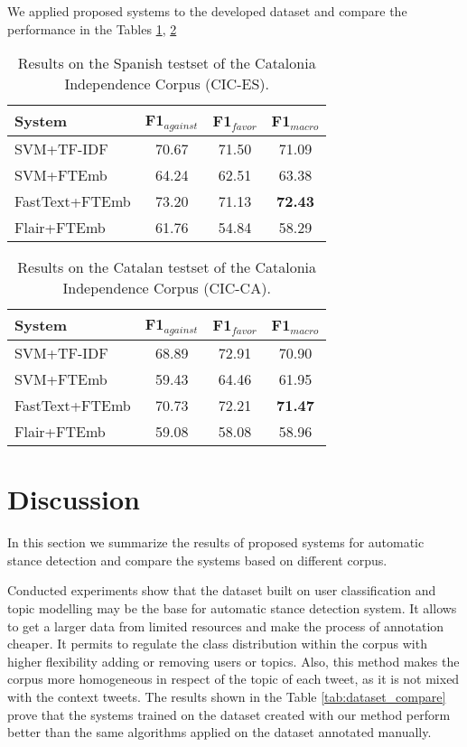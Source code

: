 \documentclass[10pt, a4paper]{article}
\begin{document}
We applied proposed systems to the developed dataset and compare the performance in the Tables \ref{tab:result_indep_es}, \ref{tab:result_indep_ca}

\begin{table}[!ht]
\centering
\begin{tabular}{lccc}\hline
\textbf{System} & F1$_{against}$ & F1$_{favor}$ & F1$_{macro}$ \\ \hline
SVM+TF-IDF & 70.67 & 71.50 & 71.09 \\
SVM+FTEmb & 64.24 & 62.51 & 63.38 \\
FastText+FTEmb & 73.20 & 71.13 & \textbf{72.43} \\
Flair+FTEmb & 61.76 & 54.84 & 58.29 \\ \hline
\end{tabular}
\caption{Results on the Spanish testset of the Catalonia Independence Corpus (CIC-ES).}\label{tab:result_indep_es}
\end{table}

\begin{table}[!ht]
\begin{tabular}{lccc}\hline
\textbf{System} & F1$_{against}$ & F1$_{favor}$ & F1$_{macro}$ \\ \hline
SVM+TF-IDF & 68.89 & 72.91 & 70.90 \\
SVM+FTEmb & 59.43 & 64.46 & 61.95 \\
FastText+FTEmb & 70.73 & 72.21 & \textbf{71.47} \\
Flair+FTEmb & 59.08 & 58.08 & 58.96 \\ \hline
\end{tabular}
\caption{Results on the Catalan testset of the Catalonia Independence Corpus (CIC-CA).}\label{tab:result_indep_ca}
\end{table}


\section{Discussion}\label{sec:discussion}

In this section we summarize the results of proposed systems for automatic stance detection and compare the systems based on different corpus.

Conducted experiments show that the dataset built on user classification and topic modelling may be the base for automatic stance detection system. It allows to get a larger data from limited resources and make the process of annotation cheaper. It permits to regulate the class distribution within the corpus with higher flexibility adding or removing users or topics. Also, this method makes the corpus more homogeneous in respect of the topic of each tweet, as it is not mixed with the context tweets. The results shown in the Table \ref{tab:dataset_compare} prove that the systems trained on the dataset created with our method perform better than the same algorithms applied on the dataset annotated manually.
\end{document}
